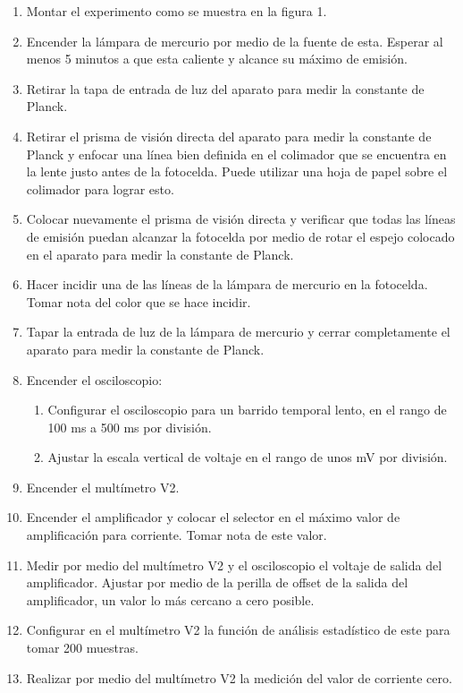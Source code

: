 \documentclass[twocolumn,a4paper,11pt]{scrartcl}
\begin{document}
\begin{enumerate}
    \item Montar el experimento como se muestra en la figura 1.
    \item Encender la lámpara de mercurio por medio de la fuente de esta. Esperar al menos 5 minutos a que esta caliente y alcance su máximo de emisión.
    \item Retirar la tapa de entrada de luz del aparato para medir la constante de Planck.
    \item Retirar el prisma de visión directa del aparato para medir la constante de Planck y enfocar una línea bien definida en el colimador que se encuentra en la lente justo antes de la fotocelda. Puede utilizar una hoja de papel sobre el colimador para lograr esto.
    \item Colocar nuevamente el prisma de visión directa y verificar que todas las líneas de emisión puedan alcanzar la fotocelda por medio de rotar el espejo colocado en el aparato para medir la constante de Planck.
    \item Hacer incidir una de las líneas de la lámpara de mercurio en la fotocelda. Tomar nota del color que se hace incidir.
    \item Tapar la entrada de luz de la lámpara de mercurio y cerrar completamente el aparato para medir la constante de Planck.
    \item Encender el osciloscopio:
    \begin{enumerate}
        \item Configurar el osciloscopio para un barrido temporal lento, en el rango de 100 ms a 500 ms por división.
        \item Ajustar la escala vertical de voltaje en el rango de unos mV por división.
    \end{enumerate}
    \item Encender el multímetro V2.
    \item Encender el amplificador y colocar el selector en el máximo valor de amplificación para corriente. Tomar nota de este valor.
    \item Medir por medio del multímetro V2 y el osciloscopio el voltaje de salida del amplificador. Ajustar por medio de la perilla de offset de la salida del amplificador, un valor lo más cercano a cero posible.
    \item Configurar en el multímetro V2 la función de análisis estadístico de este para tomar 200 muestras.
    \item Realizar por medio del multímetro V2 la medición del valor de corriente cero.

\end{enumerate}
\end{document}
